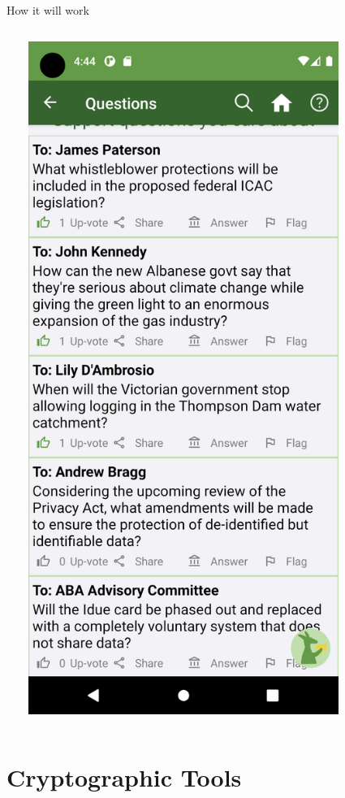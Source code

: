 \documentclass[10pt,xcolor=svgnames,169]{beamer} %
\begin{document}
\begin{frame}[fragile]{How it will work}
\begin{columns}
\begin{column}{0.5\textwidth}
	
		\end{column}
		\begin{column}{0.4\textwidth}  %
				\includegraphics[width=0.8\textwidth]{Screenshot}
		\end{column}
	\end{columns}
		
	\end{frame}
	
	\section{Cryptographic Tools}
	
\end{document}
